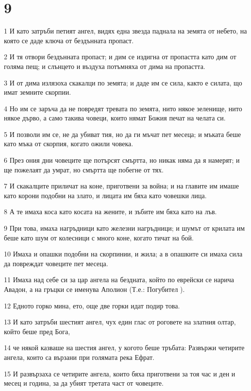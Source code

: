 \chapter{9}

\par 1 И като затръби петият ангел, видях една звезда паднала на земята от небето, на която се даде ключа от бездънната пропаст.
\par 2 И тя отвори бездънната пропаст; и дим се издигна от пропастта като дим от голяма пещ; и слънцето и въздуха потъмняха от дима на пропастта.
\par 3 И от дима излязоха скакалци по земята; и даде им се сила, както е силата, що имат земните скорпии.
\par 4 Но им се заръча да не повредят тревата по земята, нито някое зеленище, нито някое дърво, а само такива човеци, които нямат Божия печат на челата си.
\par 5 И позволи им се, не да убиват тия, но да ги мъчат пет месеца; и мъката беше като мъка от скорпия, когато ожили човека.
\par 6 През ония дни човеците ще потърсят смъртта, но никак няма да я намерят; и ще пожелаят да умрат, но смъртта ще побегне от тях.
\par 7 И скакалците приличат на коне, приготвени за война; и на главите им имаше като корони подобни на злато, и лицата им бяха като човешки лица.
\par 8 А те имаха коса като косата на жените, и зъбите им бяха като на лъв.
\par 9 При това, имаха нагръдници като железни нагръдници; и шумът от крилата им беше като шум от колесници с много коне, когато тичат на бой.
\par 10 Имаха и опашки подобни на скорпинии, и жила; а в опашките си имаха сила да повреждат човеците пет месеца.
\par 11 Имаха над себе си за цар ангела на бездната, който по еврейски се нарича Авадон, а на гръцки се именува Аполион (Т.е.: Погубител ).
\par 12 Едното горко мина, ето, още две горки идат подир това.
\par 13 И като затръби шестият ангел, чух един глас от роговете на златния олтар, който беше пред Бога,
\par 14 че някой казваше на шестия ангел, у когото беше тръбата: Развържи четирите ангела, които са вързани при голямата река Ефрат.
\par 15 И развързаха се четирите ангела, които бяха приготвени за тоя час и ден и месец и година, за да убият третата част от човеците.
